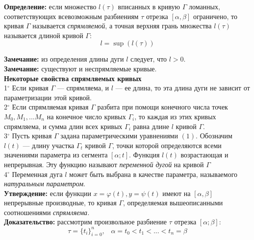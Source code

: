 \documentclass{article}
\begin{document}
  \textbf{Определение:} если множество $l(\tau)$ вписанных в кривую $\Gamma$ ломанных, соответствующих всевозможным разбиениям $\tau$ отрезка $[\alpha,\beta]$ ограничено, то кривая $\Gamma$ называется \textit{спрямляемой}, а точная верхняя грань множества $l(\tau)$ называется длиной кривой $\Gamma$:
  \begin{equation}
    l=\sup(l(\tau))
  \end{equation}
  
  \textbf{Замечание:} из определения длины дуги $l$ следует, что $l>0$.\\
  
  \textbf{Замечание:} существуют и неспрямляемые кривые.\\
  
  \large\textbf{Некоторые свойства спрямляемых кривых}\normalsize\\
  
  1$^\circ$ Если кривая $\Gamma$ --- спрямляема, и $l$ --- ее длина, то эта длина дуги не зависит от параметризации этой кривой.\\
  
  2$^\circ$ Если спрямляемая кривая $\Gamma$ разбита при помощи конечного числа точек $M_0, M_1, ... M_n$ на конечное число кривых $\Gamma_i$, то каждая из этих кривых спрямляема, и сумма длин всех кривых $\Gamma_i$ равна длине $l$ кривой $\Gamma$.\\
  
  3$^\circ$ Пусть кривая $\Gamma$ задана параметрическими уравнениями $(1)$. Обозначим $l(t)$ --- длину участка $\Gamma_t$ кривой $\Gamma$, точки которой определяются всеми значениями параметра из сегмента $[\alpha;t]$. Функция $l(t)$ возрастающая и непрерывная. Эту функцию называют \textit{переменной дугой} на кривой $\Gamma$\\
  
  4$^\circ$ Переменная дуга $l$ может быть выбрана в качестве параметра, называемого \textit{натуральным параметром}.\\
  
  \textbf{Утверждение:} если функции $x=\varphi(t), y=\psi(t)$ имеют на $[\alpha,\beta]$ непрерывные производные, то кривая $\Gamma$, определяемая вышеописанными соотношениями \textit{спрямляема.}\\
  
  \textbf{Доказательство:} рассмотрим произвольное разбиение $\tau$ отрезка $[\alpha;\beta]$:
  \begin{equation}
    \tau=\{t_i\}_{i=0}^n, \;\;\; \alpha=t_0<t_1<...<t_n=\beta
  \end{equation}
  
\end{document}
